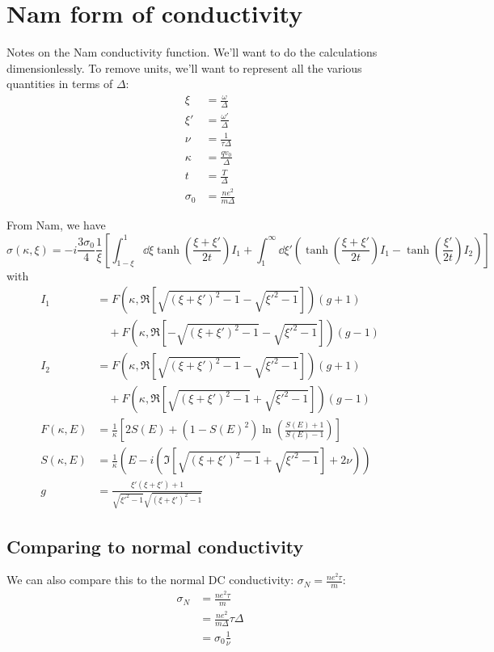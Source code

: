 \documentclass[11pt]{article}
\begin{document}
\graphicspath{{figures/}}

\section{Nam form of conductivity} \label{sec:NamForm}

Notes on the Nam conductivity function.\supercite{Nam1967}
We'll want to do the calculations dimensionlessly.
To remove units, we'll want to represent all the various quantities in terms of $\Delta$:
\begin{align}
	\xi &= \frac{\omega}{\Delta} \\
	\xi' &= \frac{\omega'}{\Delta} \\
	\nu &= \frac{1}{\tau \Delta} \\
	\kappa &= \frac{q v_0}{\Delta} \\
	t &= \frac{T}{\Delta} \\
	\sigma_0 &= \frac{n e^2}{m \Delta}
\end{align}

From Nam, we have
\begin{equation}
	\sigma(\kappa, \xi) = -i \frac{3 \sigma_0}{4} \frac{1}{\xi}\left[\int_{1 - \xi}^{1}\dd{\xi} \tanh(\frac{\xi + \xi'}{2 t}) I_1 + \int_{1}^{\infty} \dd{\xi'} \left( \tanh(\frac{\xi + \xi'}{2t}) I_1  - \tanh(\frac{\xi'}{2t})I_2 \right) \right]
\end{equation}
with
\begin{align}
	I_1 &= F(\kappa, \Re[\sqrt{(\xi + \xi')^2 - 1} - \sqrt{\xi'^2 - 1}]) (g + 1) \nonumber\\
	&\quad + F(\kappa, \Re[-\sqrt{(\xi + \xi')^2 - 1} - \sqrt{\xi'^2 - 1}]) (g - 1) \\
	I_2 &= F(\kappa, \Re[\sqrt{(\xi + \xi')^2 - 1} - \sqrt{\xi'^2 - 1}]) (g + 1) \nonumber\\
	&\quad + F(\kappa, \Re[\sqrt{(\xi + \xi')^2 - 1} + \sqrt{\xi'^2 - 1}]) (g - 1) \\
	F(\kappa, E) &= \frac{1}{\kappa} \left[2 S(E) + (1 - S(E)^2)\ln(\frac{S(E) + 1}{S(E) - 1})\right]  \\
	S(\kappa, E) &= \frac{1}{\kappa} \left(E - i \left(\Im[\sqrt{(\xi + \xi')^2 - 1} + \sqrt{\xi'^2 - 1}] + 2 \nu \right) \right) \\
	g  &= \frac{\xi' \left( \xi + \xi'\right) + 1}{\sqrt{\xi'^2 - 1}\sqrt{(\xi + \xi')^2 - 1}}
\end{align}

\subsection{Comparing to normal conductivity} \label{subsec:NamForm.NormalConductivity}
We can also compare this to the normal DC conductivity: $\sigma_N = \frac{n e^2 \tau}{m}$:
\begin{align}
	\sigma_N &= \frac{n e^2 \tau}{m} \\
	&= \frac{n e^2}{m \Delta} \tau \Delta \\
	&= \sigma_0 \frac{1}{\nu}
\end{align}
\end{document}
